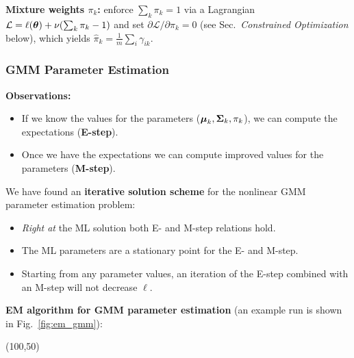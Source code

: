   \textbf{Mixture weights $\pi_k$:} enforce $\sum_k \pi_k=1$ via a Lagrangian $\mathcal L = \ell(\bm{\mathrm{\theta}})+\nu(\sum_k \pi_k-1)$ and set $\partial\mathcal L/\partial \pi_k=0$ (see Sec.~\emph{Constrained Optimization} below),
  which yields $\hat \pi_k=\tfrac{1}{m}\sum_i \gamma_{ik}$.

  \subsubsection*{GMM Parameter Estimation}
    \textbf{Observations:}

  \begin{itemize}
    \item If we know the values for the parameters ($\bm{\mathrm{\mu}}_k, \mathbf{\Sigma}_k, \pi_k$), we can compute the expectations (\textbf {E-step}).     
    \item Once we have the expectations we can compute improved values for the parameters (\textbf {M-step}).
  \end{itemize}
     
  We have found an   \textbf{iterative solution scheme} for the nonlinear GMM parameter estimation problem:

  \begin{itemize}
    \item \emph{Right at} the ML solution both E- and M-step relations hold.   
    \item The ML parameters are a stationary point for the E- and M-step.   
    \item Starting from any parameter values, an iteration of the E-step combined with an M-step will not decrease $\ell$.
  \end{itemize}
\textbf{EM algorithm for GMM parameter estimation} (an example run is shown in Fig.~\ref{fig:em_gmm}):\\

  \begin{centernss}
    \begin{struktogramm}(100,50)
      \untilend
    \end{struktogramm}
  \end{centernss}

